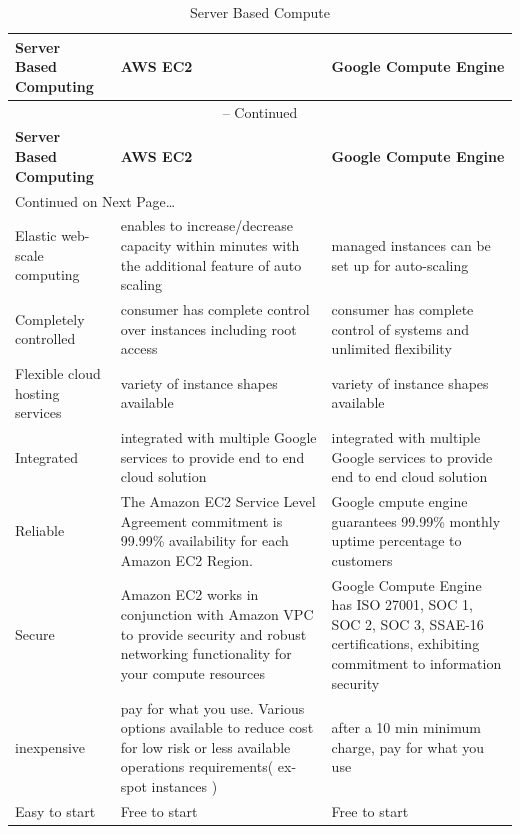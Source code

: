 \begin{longtable}{p{3.7cm}|p{3.7cm}|p{3.7cm}}
\caption{Server Based Compute \label{table:compute}}\\

\hline
\hline
{\textbf{Server Based Computing}} &
{\textbf{AWS EC2}} &
{\textbf{Google Compute Engine}}\\
\hline
\endfirsthead


\multicolumn{3}{c}{{\tablename} \thetable{} -- Continued} \\[0.5ex]
\hline
\hline
{\textbf{Server Based Computing}} &
{\textbf{AWS EC2}} &
{\textbf{Google Compute Engine}}\\
\hline
\endhead

\multicolumn{3}{l}{{Continued on Next Page\ldots}} \\
\endfoot


\hline \hline
\endlastfoot


{Elastic web-scale computing} & {enables to increase/decrease capacity within minutes with the additional feature of auto scaling} & {managed instances can be set up for auto-scaling} \\ %
\hline
{Completely controlled} & {consumer has complete control over instances including root access} & {consumer has complete control of systems and unlimited flexibility} \\
\hline
{Flexible cloud hosting services} & {variety of instance shapes available} & {variety of instance shapes available} \\
\hline
{Integrated} & {integrated with multiple Google services to provide end to end cloud solution} & {integrated with multiple Google services to provide end to end cloud solution} \\
\hline
{Reliable} & {The Amazon EC2 Service Level Agreement commitment is 99.99\% availability for each Amazon EC2 Region.} & {Google cmpute engine guarantees 99.99\%  monthly uptime percentage to customers} \\ 
\hline
{Secure} & {Amazon EC2 works in conjunction with Amazon VPC to provide security and robust networking functionality for your compute resources} & {Google Compute Engine has ISO 27001, SOC 1, SOC 2, SOC 3, SSAE-16 certifications, exhibiting  commitment to information security}\\
\hline
{inexpensive} & {pay for what you use. Various options available to reduce cost for low risk or less available operations requirements( ex- spot instances )} & {after a 10 min minimum charge, pay for what you use} \\
\hline
{Easy to start} & {Free to start} & {Free to start} \\

\end{longtable}


